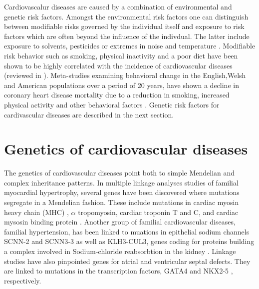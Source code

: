 Cardiovascalur diseases are caused by a combination of environmental and genetic risk factors. Amongst the environmental risk factors one can distinguish between modifiable risks governed by the individual itself and exposure to risk factors which are often beyond the influence of the indivdual. The latter include exposure to solvents, pesticides or extremes in noise and temperature \citep{Bhatnagar2004,Brook2010,Babisch2014}. Modifiable risk behavior such as smoking, physical inactivity and a poor diet have been shown to be highly correlated with the incidence of cardiovascular diseases (reviewed in \citep{OToole2008,Cosselman2015}). Meta-studies examining behavioral change in the English,Welsh and American populations over a period of 20 years, have shown a decline in coronary heart disease mortality due to a reduction in smoking, increased physical activity and other behavioral factors \citep{Unal2004,Ford2007}. Genetic risk factors for cardivascular diseases are described in the next section. 


\section{Genetics of cardiovascular diseases}
The genetics of cardiovascular diseases point both to simple Mendelian and complex inheritance patterns. In multiple linkage analyses studies of familial myocardial hypertrophy, several genes have been discovered where mutations segregate in a Mendelian fashion. These include mutations in cardiac myosin heavy chain (MHC) \citep{Geisterfer-Lowrance1990}, \(\alpha\) tropomyosin, cardiac troponin T and C, \citep{Thierfelder1994, Kimura1997} and cardiac mysosin binding protein \citep{Carrier1993,Bonne1995}. Another group of familial cardiovascular diseases, familial hypertension, has been linked to muations in epithelial sodium channels  SCNN-2 and SCNN3-3 \citep{Boyden2012,Glover2014} as well as KLH3-CUL3, genes coding for proteins building a complex involved in Sodium-chloride reabsorbtion in the kidney  \citep{Hansson1995}. Linkage studies have also pinpointed genes for atrial and ventricular septal defects. They are linked to mutations in the transcription factors,  GATA4 \citep{Schott1998} and NKX2-5 \citep{Garg2003}, respectively. 

